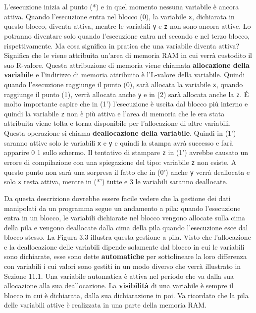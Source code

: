 L'esecuzione inizia al punto (*) e in quel momento nessuna variabile è ancora attiva.
Quando l'esecuzione entra nel blocco (0), la variabile \texttt{x}, dichiarata in questo blocco, diventa attiva, mentre le variabili \texttt{y} e \texttt{z} non sono ancora attive.
Lo potranno diventare solo quando l'esecuzione entra nel secondo e nel terzo blocco, rispettivamente.
Ma cosa significa in pratica che una variabile diventa attiva?
Significa che le viene attribuita un'area di memoria RAM in cui verrà custodito il suo R-valore.
Questa attribuzione di memoria viene chiamata \textbf{allocazione della variabile} e l'indirizzo di memoria attribuito è l'L-valore della variabile.
Quindi quando l'esecuzione raggiunge il punto (0), sarà allocata la variabile \texttt{x}, quando raggiunge il punto (1), verrà allocata anche \texttt{y} e in (2) sarà allocata anche la \texttt{z}.
É molto importante capire che in (1') l'esecuzione è uscita dal blocco più interno e quindi la variabile \texttt{z} non è più attiva e l'area di memoria che le era stata attribuita viene tolta e torna disponibile per l'allocazione di altre variabili.
Questa operazione si chiama \textbf{deallocazione della variabile}.
Quindi in (1') saranno attive solo le variabili \texttt{x} e \texttt{y} e quindi la stampa avrà successo e farà apparire 0 1 sullo schermo.
Il tentativo di stampare \texttt{z} in (1') avrebbe causato un errore di compilazione con una spiegazione del tipo: variabile \texttt{z} non esiste.
A questo punto non sarà una sorpresa il fatto che in (0') anche \texttt{y} verrà deallocata e solo \texttt{x} resta attiva, mentre in (*') tutte e 3 le variabili saranno deallocate.

Da questa descrizione dovrebbe essere facile vedere che la gestione dei dati manipolati da un programma segue un andamento a pila: quando l'esecuzione entra in un blocco, le variabili dichiarate nel blocco vengono allocate sulla cima della pila e vengono deallocate dalla cima della pila quando l'esecuzione esce dal blocco stesso.
La Figura 3.3 illustra questa gestione a pila.
Visto che l'allocazione e la deallocazione delle variabili dipende solamente dal blocco in cui le variabili sono dichiarate, esse sono dette \textbf{automatiche} per sottolineare la loro differenza con variabili i cui valori sono gestiti in un modo diverso che verrà illustrato in Sezione 11.1.
Una variabile automatica è attiva nel periodo che va dalla sua allocazione alla sua deallocazione.
La \textbf{visibilità} di una variabile è sempre il blocco in cui è dichiarata, dalla sua dichiarazione in poi.
Va ricordato che la pila delle variabili attive è realizzata in una parte della memoria RAM. 

